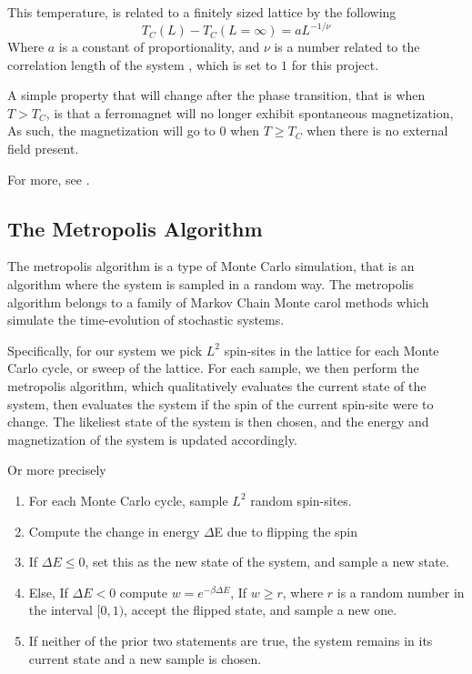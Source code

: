 \documentclass[10pt,showpacs,preprintnumbers,amsmath,amssymb,nofootinbib,aps,prl,twocolumn,groupedaddress,superscriptaddress,showkeys]{revtex4-1}
\begin{document}
      This temperature, is related to a finitely sized lattice by the following \cite{project4}
      \begin{equation}
        T_C(L) - T_C(L=\infty) = aL^{-1/\nu}
        \label{eqn:T_C(L) - T_C(L=infty)}
      \end{equation}
      Where $a$ is a constant of proportionality, and $\nu$ is a number related to the correlation length of the system \cite{project4}, which is set to $1$ for this project.

      A simple property that will change after the phase transition, that is when $T > T_C$, is that a ferromagnet will no longer exhibit spontaneous magnetization, As such, the magnetization will go to $0$ when $T\geq T_C$ when there is no external field present.

      For more, see \textcite{statmek_lecnotes}.


  \subsection{The Metropolis Algorithm}
    The metropolis algorithm is a type of Monte Carlo simulation, that is an algorithm where the system is sampled in a random way. The metropolis algorithm belongs to a family of Markov Chain Monte carol methods which simulate the time-evolution of stochastic systems.

    Specifically, for our system we pick $L^2$ spin-sites in the lattice for each Monte Carlo cycle, or sweep of the lattice.
    For each sample, we then perform the metropolis algorithm, which qualitatively evaluates the current state of the system, then evaluates the system if the spin of the current spin-site were to change. The likeliest state of the system is then chosen, and the energy and magnetization of the system is updated accordingly.

    Or more precisely

    \begin{enumerate}
      \item For each Monte Carlo cycle, sample $L^2$ random spin-sites.
      \item Compute the change in energy $\Delta$E due to flipping the spin
      \item If $\Delta E\leq 0$, set this as the new state of the system, and sample a new state.
      \item Else, If $\Delta E < 0$ compute $w = e^{-\beta\Delta E}$, If $w \geq r$, where $r$ is a random number in the interval $[0, 1)$, accept the flipped state, and sample a new one.
      \item If neither of the prior two statements are true, the system remains in its current state and a new sample is chosen.
    \end{enumerate}
\end{document}
